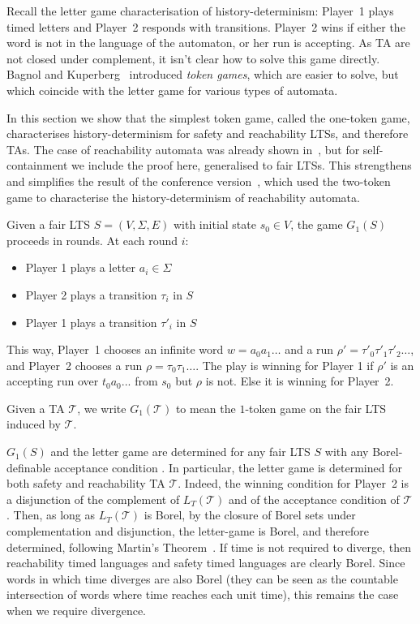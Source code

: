 \documentclass[10pt,a4paper]{amsart}
\theoremstyle{definition}
\numberwithin{equation}{section}
\newcommand{\T}{\mathcal{T}}
\newcommand{\lang}{L_T}  %
\newcommand{\lts}{S}
\begin{document}
Recall the letter game characterisation of history-determinism: Player~1 plays timed letters and Player~2 responds with transitions.  Player~2 wins if either the word is not in the language of the automaton, or her run is accepting.
As TA are not closed under complement, it isn't clear how to solve this game directly. Bagnol and Kuperberg~\cite{BK18} introduced  \textit{token games}, which are easier to solve, but which coincide with the letter game for various types of automata\cite{BK18,BKLS20,BL22}.

In this section we show that the simplest token game, called the one-token game, characterises history-determinism for safety and reachability LTSs, and therefore TAs. The case of reachability automata was already shown in~\cite{BL22}, but for self-containment we include the proof here, generalised to fair LTSs. This strengthens and simplifies the result of the conference version~\cite{HLT2022}, which used the two-token game to characterise the history-determinism of reachability automata.


\begin{definition}
Given a fair LTS 
$\lts=(V,\Sigma,E)$ with initial state $s_0\in V$, the game $G_1(\lts)$ proceeds in rounds. At each round $i$:
\begin{itemize}
\item Player 1 plays a letter $a_i\in\Sigma$
\item Player 2 plays a transition $\tau_i$ in $\lts$
\item Player 1 plays a transition $\tau'_{i}$ in $\lts$
\end{itemize}
This way, Player~1 chooses an infinite word 
$w=a_0a_1\ldots$ and a run $\rho'=\tau'_{0}\tau'_{1}\tau'_{2}\dots$,
and Player~2 chooses a run $\rho=\tau_0\tau_1\dots$.
The play is winning for Player 1 if $\rho'$ is an accepting run over $t_0a_0...$ from $s_0$ but $\rho$ is not. Else it is winning for Player~2.

Given a TA $\T$, we write $G_1(\T)$ to mean the $1$-token game on the fair LTS induced by $\T$.
\end{definition}

\begin{remark}\label{determinacy} $G_1(\lts)$ and the letter game are determined for any fair LTS $\lts$ with any Borel-definable acceptance condition \cite{M1975}.
In particular, the letter game is determined for both safety and reachability TA $\T$. Indeed, the winning condition for Player~2 is a disjunction of the complement of $\lang(\T)$ and of the acceptance condition of $\T$. Then, as long as $\lang(\T)$ is Borel, by the closure of Borel sets under complementation and disjunction, the letter-game is Borel, and therefore determined, following Martin's Theorem~\cite{M1975}. If time is not required to diverge, then reachability timed languages and safety timed languages are clearly Borel. Since words in which time diverges are also Borel (they can be seen as the countable intersection of words where time reaches each unit time), this remains the case when we require divergence.
\end{remark}
\end{document}
